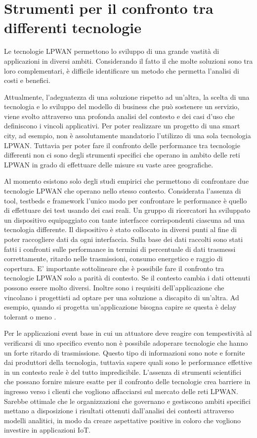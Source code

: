 \documentclass[12pt,a4paper,openright,twoside]{report}
\begin{document}
\section{Strumenti per il confronto tra differenti tecnologie }
Le tecnologie LPWAN permettono lo sviluppo di una grande vastit\`a di applicazioni in diversi ambiti. 
Considerando il fatto il che molte soluzioni sono tra loro complementari, \`e difficile identificare un metodo che permetta l'analisi di costi e benefici. 

Attualmente, l'adeguatezza di una soluzione rispetto ad un'altra, la scelta di una tecnologia e lo sviluppo del modello di business che pu\`o sostenere un servizio, viene svolto attraverso una profonda analisi del contesto e dei casi d'uso che definiscono i vincoli applicativi.
Per poter realizzare un progetto di una smart city, ad esempio, non \`e assolutamente mandatorio l'utilizzo di una sola tecnologia LPWAN. 
Tuttavia per poter fare il confronto delle performance tra tecnologie differenti non ci sono degli strumenti specifici che operano in ambito delle reti LPWAN in grado di effettuare delle misure su vaste aree geografiche. 

Al momento esistono solo degli studi empirici che permettono di confrontare due tecnologie LPWAN che operano nello stesso contesto.
Considerata l'assenza di tool, testbeds e framework l'unico modo per confrontare le performance \`e quello di effettuare dei test usando dei casi reali. 
Un gruppo di ricercatori ha sviluppato un dispositivo equipaggiato con tante interfacce corrispondenti ciascuna ad una tecnologia differente. Il dispositivo \`e stato collocato in diversi punti al fine di poter raccogliere dati da ogni interfaccia. 
Sulla base dei dati raccolti sono stati fatti i confronti sulle performance in termini di percentuale di dati trasmessi correttamente, ritardo nelle trasmissioni, consumo energetico e raggio di copertura. 
E' importante sottolineare che \`e possibile fare il confronto tra tecnologie LPWAN solo a parit\`a di contesto. Se il contesto cambia i dati ottenuti possono essere molto diversi.
Inoltre sono i requisiti dell'applicazione che vincolano i progettisti ad optare per una soluzione a discapito di un'altra. Ad esempio, quando si progetta un'applicazione bisogna capire se questa \`e delay tolerant o meno \cite{K18}. 

Per le applicazioni event base in cui un attuatore deve reagire con tempestivit\`a al verificarsi di uno specifico evento non \`e possibile adoperare tecnologie che hanno un forte ritardo di trasmissione. Questo tipo di informazioni sono note e fornite dai produttori della tecnologia, tuttavia sapere quali sono le performance effettive in un contesto reale \`e del tutto impredicibile.
L'assenza di strumenti scientifici che possano fornire misure esatte per il confronto delle tecnologie crea barriere in ingresso verso i clienti che vogliono affacciarsi sul mercato delle reti LPWAN.
Sarebbe ottimale che le organizzazioni che governano e gestiscono ambiti specifici mettano a disposizione i risultati ottenuti dall'analisi dei contesti attraverso modelli analitici, in modo da creare aspettative positive in coloro che vogliono investire in applicazioni IoT.
\end{document}
